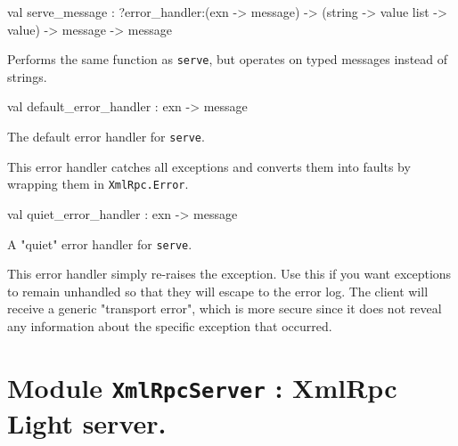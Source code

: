 \documentclass[11pt]{article}
\begin{document}
\label{val:XmlRpc.serve-underscoremessage}\begin{ocamldoccode}
val serve_message :
  ?error_handler:(exn -> message) ->
  (string -> value list -> value) ->
  message -> message
\end{ocamldoccode}
\begin{ocamldocdescription}
Performs the same function as {\tt{serve}}, but operates on typed messages
    instead of strings.


\end{ocamldocdescription}




\label{val:XmlRpc.default-underscoreerror-underscorehandler}\begin{ocamldoccode}
val default_error_handler : exn -> message
\end{ocamldoccode}
\begin{ocamldocdescription}
The default error handler for {\tt{serve}}.


    This error handler catches all exceptions and converts them into
    faults by wrapping them in {\tt{XmlRpc.Error}}.


\end{ocamldocdescription}




\label{val:XmlRpc.quiet-underscoreerror-underscorehandler}\begin{ocamldoccode}
val quiet_error_handler : exn -> message
\end{ocamldoccode}
\begin{ocamldocdescription}
A "quiet" error handler for {\tt{serve}}.


    This error handler simply re-raises the exception. Use this if you
    want exceptions to remain unhandled so that they will escape to the
    error log. The client will receive a generic "transport error",
    which is more secure since it does not reveal any information about
    the specific exception that occurred.


\end{ocamldocdescription}


\section{Module {\tt{XmlRpcServer}} : XmlRpc Light server.}
\label{module:XmlRpcServer}
\end{document}
